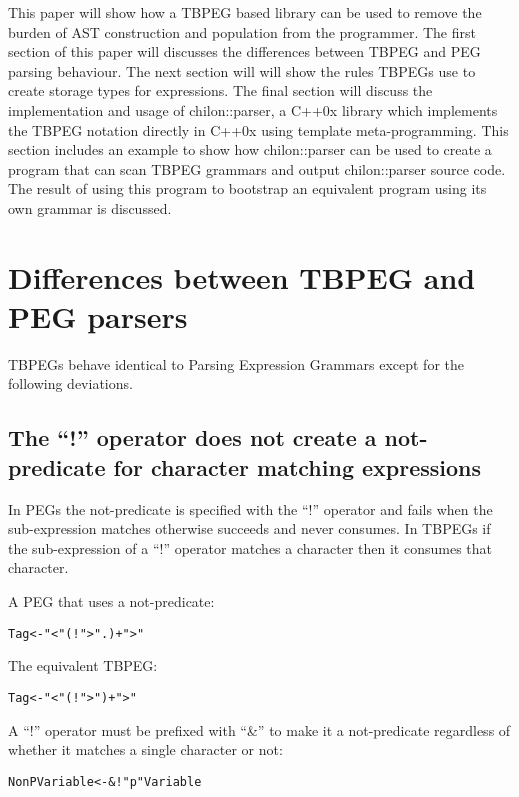 \documentclass[a4paper,11pt]{article}
\begin{document}
This paper will show how a TBPEG based library can be used to remove the burden of AST construction and population from the programmer.
The first section of this paper will discusses the differences between TBPEG and PEG parsing behaviour.
The next section will will show the rules TBPEGs use to create storage types for expressions.
The final section will discuss the implementation and usage of chilon::parser, a C++0x library which implements the TBPEG notation directly in C++0x using template meta-programming.
This section includes an example to show how chilon::parser can be used to create a program that can scan TBPEG grammars and output chilon::parser source code.
The result of using this program to bootstrap an equivalent program using its own grammar is discussed.

\section{Differences between TBPEG and PEG parsers}

TBPEGs behave identical to Parsing Expression Grammars\cite{peg} except for the following deviations.

\subsection{The ``!'' operator does not create a not-predicate for character matching expressions}

In PEGs the not-predicate is specified with the ``!'' operator and fails when the sub-expression matches otherwise succeeds and never consumes.
In TBPEGs if the sub-expression of a ``!'' operator matches a character then it consumes that character.

A PEG that uses a not-predicate:
\begin{alltt}
    Tag <- "<" (! ">" .)+ ">"
\end{alltt}

The equivalent TBPEG:
\begin{alltt}
    Tag <- "<" (! ">")+ ">"
\end{alltt}

A ``!'' operator must be prefixed with ``\&'' to make it a not-predicate regardless of whether it matches a single character or not:
\begin{alltt}
    NonPVariable <- &!"p" Variable
\end{alltt}
\end{document}
